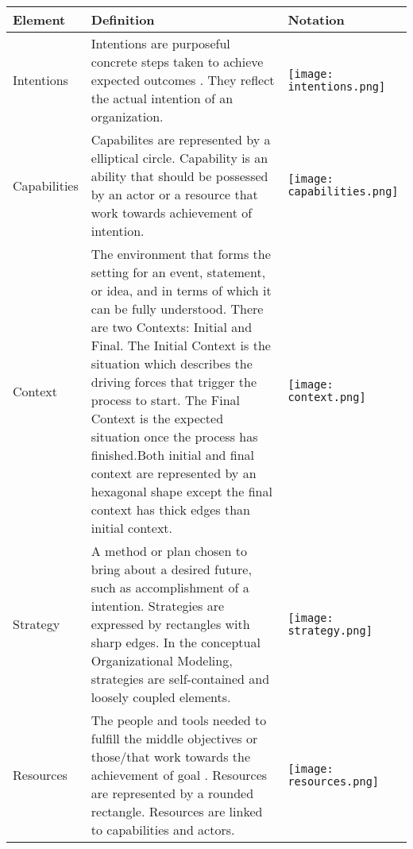 \begin{center}
	\begin{longtable}{p{3cm}p{10cm}p{3cm}}
		\toprule 
		\textbf{Element} & \textbf{Definition} & \textbf{Notation} \\
		\midrule
		\endfirsthead
		Intentions 			& Intentions are purposeful concrete steps taken to achieve expected outcomes . They reflect the actual intention of an organization. & \begin{center} \texttt{[image: intentions.png]}  \end{center}  \\  
		
		Capabilities	&  Capabilites are represented by a elliptical circle. Capability is an ability that should be possessed by an actor or a resource that work towards achievement of intention.   & \begin{center} \texttt{[image: capabilities.png]} \end{center}   \\
		
		Context				& The environment that forms the setting for an event, statement, or idea, and in terms of which it can be fully understood. There are two Contexts: Initial and Final. The Initial Context is the situation which describes the driving forces that trigger the process to start. The Final Context is the expected situation once the process has finished.Both initial and final context are represented by an hexagonal shape except the final context has thick edges than initial context.  & \begin{center} \texttt{[image: context.png]} \end{center}  \\
		
		
		Strategy		&  A method or plan chosen to bring about a desired future, such as accomplishment of a intention. Strategies are expressed by rectangles with sharp edges. In the conceptual Organizational Modeling, strategies are self-contained and loosely coupled elements.   & \begin{center} \texttt{[image: strategy.png]} \end{center}   \\
		
		Resources					& The people and tools needed to fulfill the middle objectives or those/that work towards the achievement of goal . Resources are represented by a rounded rectangle. Resources are linked to capabilities and actors. & \begin{center} \texttt{[image: resources.png]} \end{center}   \\
		

\end{longtable}
\end{center}
